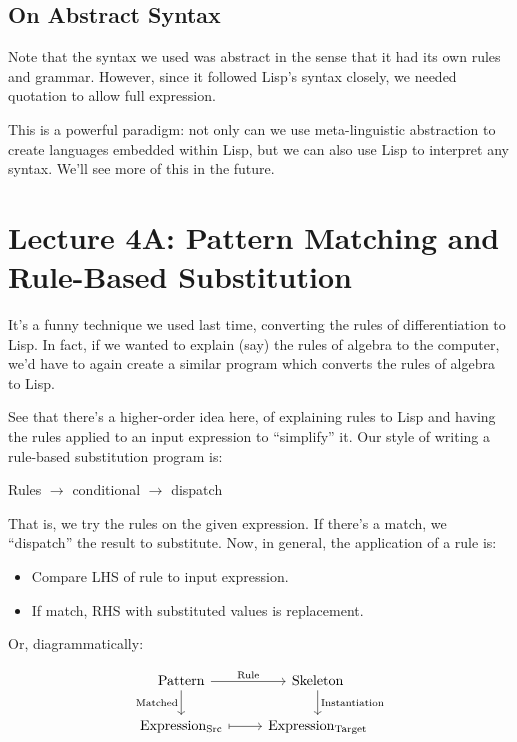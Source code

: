 \documentclass[9pt]{report}
\begin{document}
\section{On Abstract Syntax}
\label{sec:org7c4019b}

Note that the syntax we used was abstract in the sense that it had
its own rules and grammar. However, since it followed Lisp's syntax
closely, we needed quotation to allow full expression.

This is a powerful paradigm: not only can we use meta-linguistic
abstraction to create languages embedded within Lisp, but we can
also use Lisp to interpret any syntax. We'll see more of this in
the future.

\chapter{Lecture 4A: Pattern Matching and Rule-Based Substitution}
\label{sec:org9fb9701}

It's a funny technique we used last time, converting the rules of
differentiation to Lisp. In fact, if we wanted to explain (say) the
rules of algebra to the computer, we'd have to again create a
similar program which converts the rules of algebra to Lisp.

See that there's a higher-order idea here, of explaining rules to
Lisp and having the rules applied to an input expression to
``simplify'' it. Our style of writing a rule-based substitution
program is:

Rules \(\rightarrow\) conditional \(\rightarrow\) dispatch

That is, we try the rules on the given expression. If there's a
match, we ``dispatch'' the result to substitute. Now, in general, the
application of a rule is:

\begin{itemize}
\item Compare LHS of rule to input expression.
\item If match, RHS with substituted values is replacement.
\end{itemize}

Or, diagrammatically:

\[\begin{tikzcd} \mathrm{Pattern} \arrow{r}{\mathrm{Rule}}
\arrow[swap]{d}{\mathrm{Matched}} & \mathrm{Skeleton}
\arrow{d}{\mathrm{Instantiation}} \\ \mathrm{Expression_{Src}}
\arrow[mapsto]{r} & \mathrm{Expression_{Target}} \end{tikzcd} \]
\end{document}
